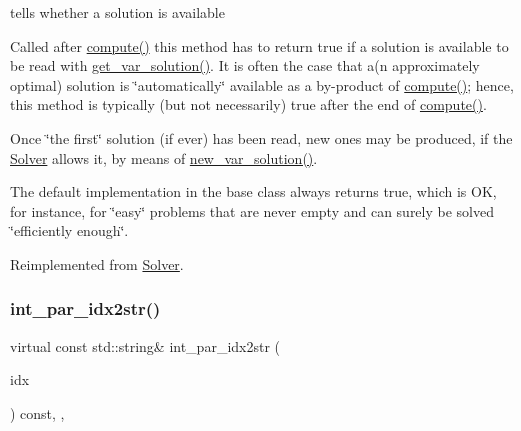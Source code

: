 tells whether a solution is available 

Called after \mbox{\hyperlink{class_s_m_spp__di__unipi__it_1_1_m_c_f_solver_afc8ff54ab05d22f4cca0fb0bfbeb7a49}{compute()}} this method has to return true if a solution is available to be read with \mbox{\hyperlink{class_s_m_spp__di__unipi__it_1_1_m_c_f_solver_ac83fa9679882440d13fb5940494699c5}{get\+\_\+var\+\_\+solution()}}. It is often the case that a(n approximately optimal) solution is \char`\"{}automatically\char`\"{} available as a by-\/product of \mbox{\hyperlink{class_s_m_spp__di__unipi__it_1_1_m_c_f_solver_afc8ff54ab05d22f4cca0fb0bfbeb7a49}{compute()}}; hence, this method is typically (but not necessarily) true after the end of \mbox{\hyperlink{class_s_m_spp__di__unipi__it_1_1_m_c_f_solver_afc8ff54ab05d22f4cca0fb0bfbeb7a49}{compute()}}.

Once \char`\"{}the first\char`\"{} solution (if ever) has been read, new ones may be produced, if the \mbox{\hyperlink{class_s_m_spp__di__unipi__it_1_1_solver}{Solver}} allows it, by means of \mbox{\hyperlink{class_s_m_spp__di__unipi__it_1_1_m_c_f_solver_a62678dc9f7485d5a2992c588c5dc7d49}{new\+\_\+var\+\_\+solution()}}.

The default implementation in the base class always returns true, which is OK, for instance, for \char`\"{}easy\char`\"{} problems that are never empty and can surely be solved \char`\"{}efficiently enough\char`\"{}. 

Reimplemented from \mbox{\hyperlink{class_s_m_spp__di__unipi__it_1_1_solver_aa96263f4e0c59225f3f5d54f03fe31ee}{Solver}}.

\mbox{\label{class_s_m_spp__di__unipi__it_1_1_m_c_f_solver_a61e973f39747f63b8f56d97cc62e32ce}} 
\subsubsection{\texorpdfstring{int\+\_\+par\+\_\+idx2str()}{int\_par\_idx2str()}}
{\footnotesize\ttfamily virtual const std\+::string\& int\+\_\+par\+\_\+idx2str (\begin{DoxyParamCaption}\item[{const \mbox{\hyperlink{class_s_m_spp__di__unipi__it_1_1_thin_compute_interface_aa3d710629ad8c434286726ad810c3b47}{idx\+\_\+type}}}]{idx }\end{DoxyParamCaption}) const\hspace{0.3cm}{\ttfamily [inline]}, {\ttfamily [override]}, {\ttfamily [virtual]}}



